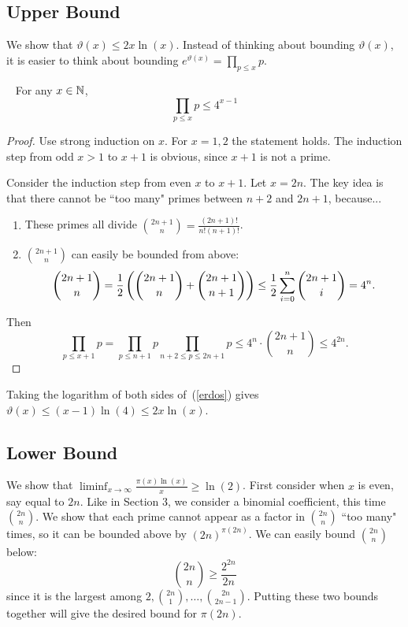 \subsection{Upper Bound}
We show that $\vartheta(x)\leq 2x\ln(x)$. Instead of thinking about bounding $\vartheta(x)$, it is easier to think about bounding $e^{\vartheta(x)}=\prod_{p\leq x} p$.
\begin{lem}~\cite[3.?]{pftb}
For any $x\in \mathbb{N}$,
\begin{equation}
\label{erdos}
\prod_{p\leq x}p\leq 4^{x-1}\end{equation}
\end{lem}
\begin{proof}
Use strong induction on $x$. For $x=1,2$ the statement holds. The induction step from odd $x>1$ to $x+1$ is obvious, since $x+1$ is not a prime.

Consider the induction step from even $x$ to $x+1$. Let $x=2n$. 
The key idea is that there cannot be ``too many" primes between $n+2$ and $2n+1$, because...
\begin{enumerate}
\item These primes all divide $\binom{2n+1}{n}=\frac{(2n+1)!}{n!(n+1)!}$.
\item %
$\binom{2n+1}{n}$ can easily be bounded from above:
\[\binom{2n+1}{n}=\frac{1}{2}\left( {\binom{2n+1}{n}+\binom{2n+1}{n+1}} \right)\leq \frac{1}{2}\sum_{i=0}^n \binom{2n+1}{i}=4^n.\]
\end{enumerate}
Then
\[\prod_{p\leq x+1} p=\prod_{p\leq n+1}p\prod_{n+2\leq p\leq 2n+1} p\leq 4^n\cdot \binom{2n+1}{n}\leq 4^{2n}.\]
\end{proof}
Taking the logarithm of both sides of~(\ref{erdos}) gives $\vartheta(x)\leq (x-1)\ln(4)\leq 2x\ln(x)$.
\subsection{Lower Bound}
We show that $\liminf_{x\to \infty}\frac{\pi(x)\ln(x)}{x}\geq \ln(2)$.
First consider when $x$ is even, say equal to $2n$. Like in Section 3, we consider a binomial coefficient, this time $\binom{2n}{n}$. We show that each prime cannot appear as a factor in $\binom{2n}{n}$ ``too many" times, so it can be bounded above by $(2n)^{\pi(2n)}$. We can easily bound $\binom{2n}{n}$ below:
\[\binom{2n}{n}\geq \frac{2^{2n}}{2n}\]
since it is the largest among $2, \binom{2n}{1},\ldots, \binom{2n}{2n-1}$. Putting these two bounds together will give the desired bound for $\pi(2n)$.

